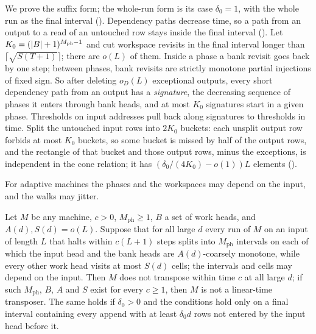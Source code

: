 \begin{outline}
We prove the suffix form; the whole-run form is its case $\delta_0=1$, with the whole run as the final interval
(). Dependency paths decrease time, so a path from an output to a read of an untouched
row stays inside the final interval (). Let $K_0=(\lvert B \rvert+1)^{M_{\mathrm{ph}}-1}$ and cut workspace revisits
in the final interval longer than $\lceil\sqrt{S(T+1)}\rceil$; there are $o(L)$ of them. Inside a phase a bank revisit goes back by one step;
between phases, bank revisits are strictly monotone partial injections of fixed sign. So after deleting $o_D(L)$ exceptional outputs,
every short dependency path from an output has a \emph{signature}, the decreasing sequence of phases it enters through bank heads, and at
most $K_0$ signatures start in a given phase. Thresholds on input addresses pull back along signatures to thresholds in time. Split the
untouched input rows into $2K_0$ buckets: each unsplit output row forbids at most $K_0$ buckets, so some bucket is missed by half of the
output rows, and the rectangle of that bucket and those output rows, minus the exceptions, is independent in the cone relation; it has
$(\delta_0/(4K_0)-o(1))L$ elements ().
\end{outline}

For adaptive machines the phases and the workspaces may depend on the input, and the walks may jitter.

\begin{theorem}\label{thm:J}
Let $M$ be any machine, $c>0$, $M_{\mathrm{ph}}\ge1$, $B$ a set of work heads, and $A(d),S(d)=o(L)$. Suppose that for all large $d$ every run of $M$ on an input of length $L$ that halts
within $c(L+1)$ steps splits into $M_{\mathrm{ph}}$ intervals on each of which the input head and the bank heads are $A(d)$-coarsely
monotone, while every other work head visits at most $S(d)$ cells; the intervals and cells may depend on the input. Then $M$ does not
transpose within time $c$ at all large $d$; if such $M_{\mathrm{ph}}$, $B$, $A$ and $S$ exist for every $c\ge1$, then $M$ is not a linear-time transposer. The same holds if $\delta_0>0$ and the conditions hold only
on a final interval containing every append with at least $\delta_0d$ rows not entered by the input head before it.
\end{theorem}

